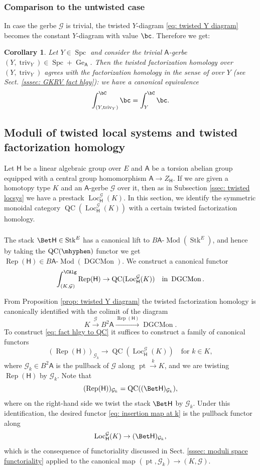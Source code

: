 \documentclass[10pt]{amsart}
\newcommand{\sssec}{\subsubsection}
\newtheorem{cor}[subsubsection]{Corollary}
\theoremstyle{remark}
\newcommand{\mc}[1]{\mathcal{#1}}
\newcommand{\te}{\text}
\newcommand{\on}{\operatorname}
\newcommand{\cG}{\mathcal{G}}
\newcommand{\DGCatSymMon}{\on{DGCMon}}
\newcommand{\lMod}{\text{-}\on{Mod}}
\newcommand{\Rep}{\on{Rep}}
\newcommand{\QC}{\on{QC}}
\newcommand{\Loc}{\on{Loc}}
\newcommand{\Stk}{\on{Stk}}
\newcommand{\Spc}{\on{Spc}}
\newcommand{\pt}{\on{pt}}
\newcommand{\sffH}{\mathsf{H}}
\newcommand{\sfA}{\mathsf{A}}
\begin{document}
\sssec{Comparison to the untwisted case} In case the gerbe $\mc{G}$ is trivial, the twisted $Y$-diagram \eqref{eq: twisted Y diagram} becomes the constant $Y$-diagram with value $\bc$. Therefore we get:

\begin{cor}\label{cor: comparison result}
    Let $Y\in\Spc$ and consider the trivial $\sfA$-gerbe  $(Y,\on{triv}_Y)\in\Spc+\on{Ge}_{\sfA}$. Then the \emph{twisted factorization homology} over $(Y,\on{triv}_Y)$ agrees with the \emph{factorization homology} in the sense of \cite{GKRV} over $Y$ (see Sect. \ref{sssec: GKRV fact hlgy}): we have a canonical equivalence
    \[\int^{\bC}_{(Y,\on{triv}_Y)}\bc=\int^{\bC}_Y \bc.\]
\end{cor}


\subsection{Moduli of twisted local systems and twisted factorization homology}
Let $\sffH$ be a linear algebraic group over $E$ and $\sfA$ be a torsion abelian group equipped with a central group homomorphism $\sfA\rightarrow Z_\sffH$. If we are given a homotopy type $K$ and an $\sfA$-gerbe $\mc{G}$ over it, then as in Subsection \ref{ssec: twisted locsys} we have a prestack $\Loc^{\mc{G}}_\sffH(K)$. In this section, we identify the symmetric monoidal category $\QC(\Loc^{\mc{G}}_\sffH(K))$ with a certain twisted factorization homology.

\sssec{}
The stack $\Bet \sffH\in\Stk^E$ has a canonical lift to $B\sfA\lMod(\Stk^E)$, and hence by taking the $\QC(\mhyphen)$ functor we get $\Rep(\sffH)\in B\sfA\lMod(\DGCatSymMon)$.
We construct a canonical functor
\begin{equation}\label{eq: fact hlgy to QC}
    \int^{\CAlg}_{(K,\mc{G})}\Rep(\sffH) \rightarrow \QC(\Loc^{\mc{G}}_\sffH(K))\quad \te{in }\DGCatSymMon.
\end{equation}

From Proposition \ref{prop: twisted Y diagram} the twisted factorization homology is canonically identified with the colimit of the diagram
\[K\xrightarrow{\cG}B^2\sfA\xrightarrow{\Rep(\sffH)}\DGCatSymMon.\]
To construct \eqref{eq: fact hlgy to QC} it suffices to construct a family of canonical functors
\begin{equation}\label{eq: insertion map at k}
    (\Rep(\sffH))_{\cG_k}\rightarrow \QC(\Loc^{\mc{G}}_\sffH(K))\quad \te{for }k\in K,
\end{equation}
where $\cG_k\in B^2\sfA$ is the pullback of $\cG$ along $\pt\xrightarrow{k}K$, and we are twisting $\Rep(\sffH)$ by $\cG_k$. Note that
\[(\Rep(\sffH))_{\cG_k}= \QC((\Bet \sffH)_{\cG_k}),\]
where on the right-hand side we twist the stack $\Bet \sffH$ by $\cG_k$. Under this identification, the desired functor \eqref{eq: insertion map at k} is the pullback functor along 
\[\Loc^{\mc{G}}_\sffH(K)\rightarrow(\Bet \sffH)_{\cG_k},\]
which is the consequence of functoriality discussed in Sect. \ref{sssec: moduli space functoriality} applied to the canonical map $(\pt,\cG_k)\rightarrow (K,\cG)$.
\medskip
\end{document}
